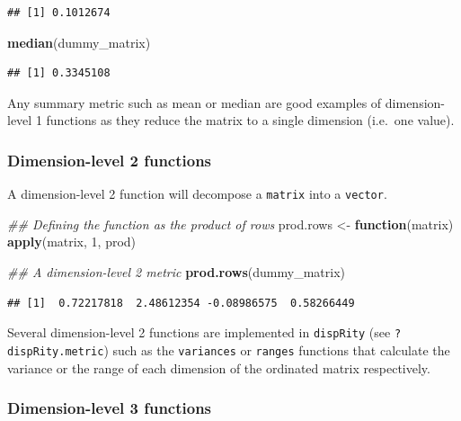 \documentclass[]{book}
\newenvironment{Shaded}{\begin{snugshade}}{\end{snugshade}}
\newcommand{\CommentTok}[1]{\textcolor[rgb]{0.56,0.35,0.01}{\textit{#1}}}
\newcommand{\ControlFlowTok}[1]{\textcolor[rgb]{0.13,0.29,0.53}{\textbf{#1}}}
\newcommand{\DecValTok}[1]{\textcolor[rgb]{0.00,0.00,0.81}{#1}}
\newcommand{\KeywordTok}[1]{\textcolor[rgb]{0.13,0.29,0.53}{\textbf{#1}}}
\newcommand{\NormalTok}[1]{#1}
\newcommand{\StringTok}[1]{\textcolor[rgb]{0.31,0.60,0.02}{#1}}
\begin{document}
\begin{verbatim}
## [1] 0.1012674
\end{verbatim}

\begin{Shaded}
\begin{Highlighting}[]
\KeywordTok{median}\NormalTok{(dummy_matrix)}
\end{Highlighting}
\end{Shaded}

\begin{verbatim}
## [1] 0.3345108
\end{verbatim}

Any summary metric such as mean or median are good examples of dimension-level 1 functions as they reduce the matrix to a single dimension (i.e.~one value).

\hypertarget{dimension-level-2-functions}{%
\subsubsection{Dimension-level 2 functions}\label{dimension-level-2-functions}}

A dimension-level 2 function will decompose a \texttt{matrix} into a \texttt{vector}.

\begin{Shaded}
\begin{Highlighting}[]
\CommentTok{## Defining the function as the product of rows}
\NormalTok{prod.rows <-}\StringTok{ }\ControlFlowTok{function}\NormalTok{(matrix) }\KeywordTok{apply}\NormalTok{(matrix, }\DecValTok{1}\NormalTok{, prod)}

\CommentTok{## A dimension-level 2 metric}
\KeywordTok{prod.rows}\NormalTok{(dummy_matrix)}
\end{Highlighting}
\end{Shaded}

\begin{verbatim}
## [1]  0.72217818  2.48612354 -0.08986575  0.58266449
\end{verbatim}

Several dimension-level 2 functions are implemented in \texttt{dispRity} (see \texttt{?dispRity.metric}) such as the \texttt{variances} or \texttt{ranges} functions that calculate the variance or the range of each dimension of the ordinated matrix respectively.

\hypertarget{dimension-level-3-functions}{%
\subsubsection{Dimension-level 3 functions}\label{dimension-level-3-functions}}
\end{document}
